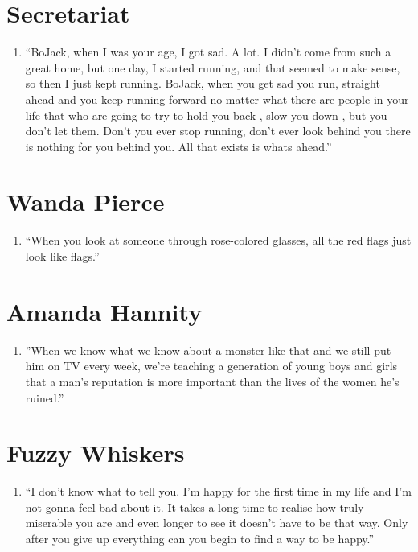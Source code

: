 \documentclass{book}
\numberwithin{equation}{section}
\begin{document}
\section{Secretariat}
\begin{enumerate}
    \item ``BoJack, when I was your age, I got sad. A lot. I didn't come from such a great home, but one day, I started running, and that seemed to make sense, so then I just kept running. BoJack, when you get sad you run, straight ahead and you keep running forward no matter what there are people in your life that who are going to try to hold you back , slow you down , but you don't let them. Don't you ever stop running, don't ever look behind you there is nothing for you behind you. All that exists is whats ahead.'' 
\end{enumerate}

\section{Wanda Pierce}
\begin{enumerate}
    \item ``When you look at someone through rose-colored glasses, all the red flags just look like flags.''
\end{enumerate}

\section{Amanda Hannity}
\begin{enumerate}
    \item ''When we know what we know about a monster like that and we still put him on TV every week, we're teaching a generation of young boys and girls that a man's reputation is more important than the lives of the women he's ruined.''
\end{enumerate}

\section{Fuzzy Whiskers}
\begin{enumerate}
    \item ``I don't know what to tell you. I'm happy for the first time in my life and I'm not gonna feel bad about it. It takes a long time to realise how truly miserable you are and even longer to see it doesn't have to be that way. Only after you give up everything can you begin to find a way to be happy.''
\end{enumerate}
\end{document}
